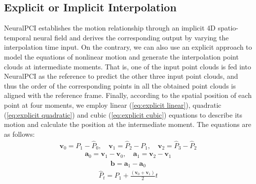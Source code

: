 \documentclass[10pt,twocolumn,letterpaper]{article}
\begin{document}
\subsection{Explicit or Implicit Interpolation}

NeuralPCI establishes the motion relationship through an implicit 4D spatio-temporal neural field and derives the corresponding output by varying the interpolation time input. On the contrary, we can also use an explicit approach to model the equations of nonlinear motion and generate the interpolation point clouds at intermediate moments. That is, one of the input point clouds is fed into NeuralPCI as the reference to predict the other three input point clouds, and thus the order of the corresponding points in all the obtained point clouds is aligned with the reference frame. Finally, according to the spatial position of each point at four moments, we employ linear (\cref{eq:explicit linear}), quadratic (\cref{eq:explicit quadratic}) and cubic (\cref{eq:explicit cubic}) equations to describe its motion and calculate the position at the intermediate moment. The equations are as follows:
\begin{equation}
\label{eq:explicit vel}
\begin{split}
    \boldsymbol{v}_{0} = P_{1} - \hat{P}_{0},\quad \boldsymbol{v}_{1} = \hat{P}_{2} - P_{1},\quad \boldsymbol{v}_{2} = \hat{P}_{3} - \hat{P}_{2}
\end{split}
\end{equation}
\vspace{-.7cm}
\begin{equation}
\label{eq:explicit acc}
\begin{split}
    \boldsymbol{a}_{0} = \boldsymbol{v}_{1} - \boldsymbol{v}_{0},\quad \boldsymbol{a}_{1} = \mathbf{v}_{2} - \boldsymbol{v}_{1}
\end{split}
\end{equation}
\vspace{-.7cm}
\begin{equation}
\label{eq:explicit b}
\begin{split}
    \boldsymbol{b} = \boldsymbol{a}_{1} - \boldsymbol{a}_{0}
\end{split}
\end{equation}
\vspace{-.5cm}
\begin{equation}
\label{eq:explicit linear}
\begin{split}
    \hat{P}_{t} = P_{1} + \frac{\left( \boldsymbol{v}_{0} + \boldsymbol{v}_{1} \right) }{2} t
\end{split}
\end{equation}
\end{document}
